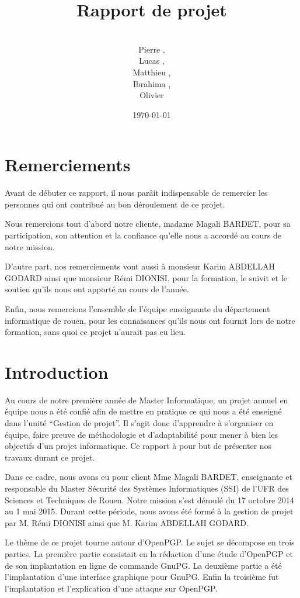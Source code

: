 \documentclass{../res/univ-projet}
\title{Rapport de projet}
\author{\\ Pierre \bsc{Balmelle},\\ Lucas \bsc{Barbay}, \\ Matthieu \bsc{Fin},
\\ Ibrahima \bsc{Sorry Barry},\\ Olivier \bsc{Thibault}}
\date{\today}
\begin{document}
\maketitle
\newpage
\section{Remerciements}
Avant de débuter ce rapport, il nous parâit indispensable de remercier les 
personnes qui ont contribué au bon déroulement de ce projet.

Nous remercions tout d'abord notre cliente, madame Magali BARDET, pour sa 
participation, son attention et la confiance qu'elle nous a accordé au 
cours de notre mission.

D'autre part, nos remerciements vont aussi à monsieur Karim ABDELLAH 
GODARD ainsi que monsieur Rémi DIONISI, pour la formation, le suivit 
et le soutien qu'ils nous ont apporté au cours de l'année.

Enfin, nous remercions l'ensemble de l'équipe enseignante du département 
informatique de rouen, pour les connaisances qu'ils nous ont fournit lors 
de notre formation, sans quoi ce projet n'aurait pas eu lieu.
\newpage
\tableofcontents

\newpage

\section{Introduction}

Au cours de notre première année de Master Informatique, un projet annuel 
en équipe nous a été confié afin de mettre en pratique ce qui nous a 
été enseigné dans l'unité ``Gestion de projet''. Il s'agit donc d'apprendre 
à s'organiser en équipe, faire preuve de méthodologie et d'adaptabilité 
pour mener à bien les objectifs d'un projet informatique. Ce rapport à pour 
but de présenter nos travaux durant ce projet.

Dans ce cadre, nous avons eu pour client Mme Magali BARDET, enseignante et 
responsable du Master Sécurité des Systèmes Informatiques (SSI) de l'UFR des 
Sciences et Techniques de Rouen. Notre mission s'est déroulé du 17 octobre 
2014 au 1 mai 2015. Durant cette période, nous avons été formé à la 
gestion de projet par M. Rémi DIONISI ainsi que M. Karim ABDELLAH GODARD.

Le thème de ce projet tourne autour d'OpenPGP. Le sujet se décompose en trois 
parties. La première partie consistait en la rédaction d'une étude d'OpenPGP 
et de son implantation en ligne de commande GnuPG. La deuxième partie a été 
l'implantation d'une interface graphique pour GnuPG. Enfin la troisième fut 
l'implantation et l'explication d'une attaque sur OpenPGP.
\end{document}
